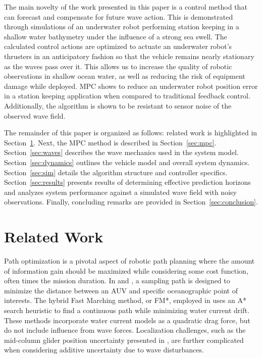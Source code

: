 \documentclass[letterpaper, 10 pt, conferences]{IEEEconf}  %
\begin{document}
The main novelty of the work presented in this paper is a control method that can forecast and compensate for future wave action. This is demonstrated through simulations of an underwater robot performing station keeping in a shallow water bathymetry under the influence of a strong sea swell. The calculated control actions are optimized to actuate an underwater robot's thrusters in an anticipatory fashion so that the vehicle remains nearly stationary as the waves pass over it. This allows us to increase the quality of robotic observations in shallow ocean water, as well as reducing the risk of equipment damage while deployed. MPC shows to reduce an underwater robot position error in a station keeping application when compared to traditional feedback control. Additionally, the algorithm is shown to be resistant to sensor noise of the observed wave field.

The remainder of this paper is organized as follows: related work is highlighted in Section~\ref{sec:related}. Next, the MPC method is described in Section~\ref{sec:mpc}. Section~\ref{sec:waves} describes the wave mechanics used in the system model. Section~\ref{sec:dynamics} outlines the vehicle model and overall system dynamics. Section~\ref{sec:sim} details the algorithm structure and controller specifics. Section~\ref{sec:results} presents results of determining effective prediction horizons and analyzes system performance against a simulated wave field with noisy observations. Finally, concluding remarks are provided in Section~\ref{sec:conclusion}. %

\section{Related Work}
\label{sec:related}

Path optimization is a pivotal aspect of robotic path planning where the amount of information gain should be maximized while considering some cost function, often times the mission duration. In \cite{smithtracking} and \cite{smithfront}, a sampling path is designed to minimize the distance between an AUV and specific oceanographic point of interests. The hybrid Fast Marching method, or FM*, employed in \cite{petres} uses an A* search heuristic to find a continuous path while minimizing water current drift. These methods incorporate water current models as a quadratic drag force, but do not include influence from wave forces. Localization challenges, such as the mid-column glider position uncertainty presented in \cite{medagodaADCP}, are further complicated when considering additive uncertainty due to wave disturbances.
\end{document}

